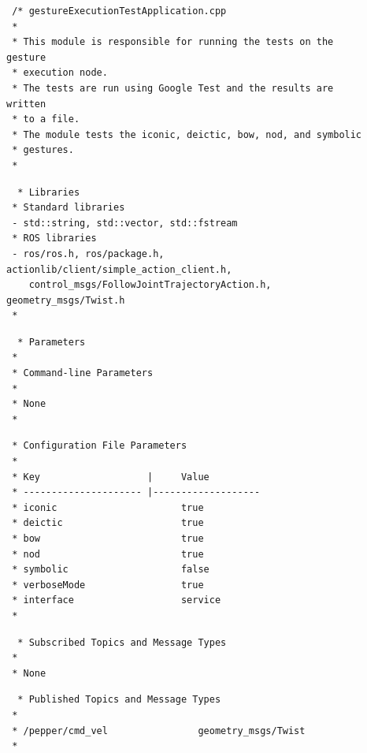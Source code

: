 \documentclass{CSSRforAfrica}
\newcommand{\checkboxChecked}{\fbox{\ding{51}}} %
\begin{document}
\begin{description}

\item[\checkboxChecked] 
 {\small 
\begin{verbatim}
 /* gestureExecutionTestApplication.cpp
 *
 * This module is responsible for running the tests on the gesture
 * execution node.
 * The tests are run using Google Test and the results are written
 * to a file. 
 * The module tests the iconic, deictic, bow, nod, and symbolic
 * gestures.
 *
\end{verbatim}}

\item[\checkboxChecked] 
 {\small 
\begin{verbatim}
  * Libraries
 * Standard libraries
 - std::string, std::vector, std::fstream
 * ROS libraries
 - ros/ros.h, ros/package.h, actionlib/client/simple_action_client.h,
    control_msgs/FollowJointTrajectoryAction.h, geometry_msgs/Twist.h
 *
\end{verbatim}}

\item[\checkboxChecked] 
 {\small 
\begin{verbatim}
  * Parameters
 *
 * Command-line Parameters
 *
 * None
 *
\end{verbatim}}

\item[\checkboxChecked] 
 {\small 
\begin{verbatim}
 * Configuration File Parameters
 *
 * Key                   |     Value 
 * --------------------- |-------------------
 * iconic                      true
 * deictic                     true
 * bow                         true
 * nod                         true
 * symbolic                    false
 * verboseMode                 true
 * interface                   service
 *
\end{verbatim}}

\item[\checkboxChecked] 
 {\small 
\begin{verbatim}
  * Subscribed Topics and Message Types
 * 
 * None
\end{verbatim}}

\item[\checkboxChecked] 
 {\small 
\begin{verbatim}                    
  * Published Topics and Message Types
 * 
 * /pepper/cmd_vel                geometry_msgs/Twist
 *
\end{verbatim}}


\end{description}
\end{document}
